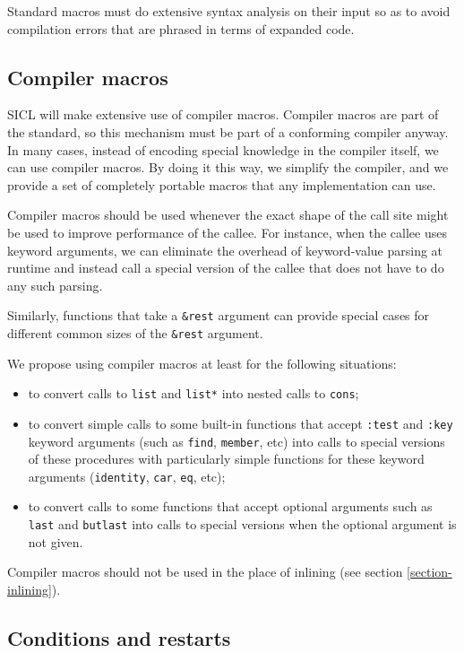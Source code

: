\documentclass{article}
\def\sysname{SICL}
\begin{document}
Standard macros must do extensive syntax analysis on their input so as
to avoid compilation errors that are phrased in terms of expanded
code.  

\subsection{Compiler macros}

{\sysname} will make extensive use of compiler macros.  Compiler
macros are part of the standard, so this mechanism must be part of a
conforming compiler anyway.  In many cases, instead of encoding
special knowledge in the compiler itself, we can use compiler macros.
By doing it this way, we simplify the compiler, and we provide a set
of completely portable macros that any implementation can use. 

Compiler macros should be used whenever the exact shape of the call
site might be used to improve performance of the callee.  For
instance, when the callee uses keyword arguments, we can eliminate the
overhead of keyword-value parsing at runtime and instead call a
special version of the callee that does not have to do any such
parsing.  

Similarly, functions that take a \texttt{\&rest} argument can provide
special cases for different common sizes of the \texttt{\&rest}
argument.

We propose using compiler macros at least for the following
situations: 

\begin{itemize}
\item to convert calls to \texttt{list} and \texttt{list*} into nested
  calls to \texttt{cons};
\item to convert simple calls to some built-in functions that accept
  \texttt{:test} and \texttt{:key} keyword arguments (such as
  \texttt{find}, \texttt{member}, etc) into calls to
  special versions of these procedures with particularly simple
  functions for these keyword arguments (\texttt{identity},
  \texttt{car}, \texttt{eq}, etc);
\item to convert calls to some functions that accept optional
  arguments such as \texttt{last} and \texttt{butlast} into calls to
  special versions when the optional argument is not given.
\end{itemize}

Compiler macros should not be used in the place of inlining (see
section \ref{section-inlining}).

\subsection{Conditions and restarts}
\end{document}
